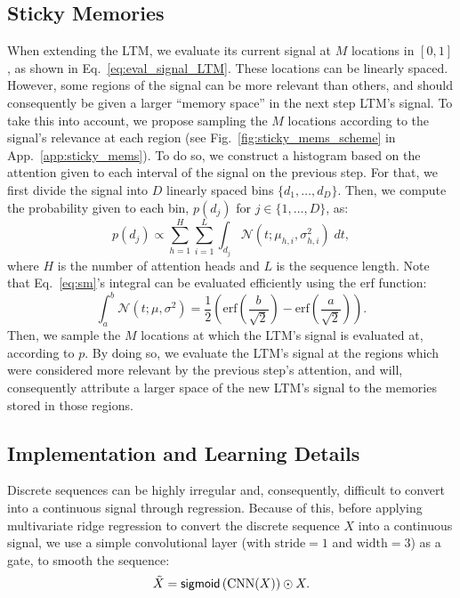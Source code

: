 \documentclass[11pt]{article}
\begin{document}
\subsection{Sticky Memories}
\label{sec:sticky_mem}
When extending the LTM, we evaluate its current signal at $M$ locations in $[0,1]$, as shown in Eq.~\ref{eq:eval_signal_LTM}. These locations can be linearly spaced. However, some regions of the signal can be more relevant than others, and should consequently be given a larger ``memory space'' in the next step LTM's signal. 
To take this into account, we propose sampling the $M$ locations according to the signal's relevance at each region (see Fig.~\ref{fig:sticky_mems_scheme} in App.~\ref{app:sticky_mems}). 
To do so, we construct a histogram based on the attention given to each interval of the signal on the previous step. For that, we first divide the signal into $D$ linearly spaced bins ${\{d_1,\dots,d_D\}}$. Then, we compute the probability given to each bin, $p(d_j)$ for ${j \in \{1,\dots,D\}}$, as:
\begin{equation}
    \label{eq:sm}
    p(d_j) \propto \sum_{h=1}^H \sum_{i=1}^L \int_{d_j} \mathcal{N} (t; \mu_{h,i}, \sigma_{h,i}^2 )\; dt,
\end{equation}
where $H$ is the number of attention heads and $L$ is the sequence length. Note that Eq.~\ref{eq:sm}'s integral can be evaluated efficiently using the erf function:
\begin{equation}
    \int_a^b \mathcal{N}(t; \mu, \sigma^2) = \frac{1}{2} \! \left( \mathrm{erf} \!\left(\dfrac{b}{\sqrt{2}}\right)-\mathrm{erf} \!\left(\dfrac{a}{\sqrt{2}}\right)\right).
\end{equation}
Then, we sample the $M$ locations at which the LTM's signal is evaluated at, according to $p$. 
By doing so, we evaluate the LTM's signal at the regions which were considered more relevant by the previous step's attention, and will, consequently attribute a larger space of the new LTM's signal to the memories stored in those regions.

\subsection{Implementation and Learning Details}

Discrete sequences can be highly irregular and, consequently, difficult to convert into a continuous signal through regression. 
Because of this, before applying multivariate ridge regression to convert the discrete sequence $X$ into a continuous signal,  we use a simple convolutional layer (with $\text{stride}=1$ and $\text{width}=3$)  as a gate, to smooth the sequence:
\begin{equation}
    \Tilde{X} = \mathsf{sigmoid} \left(\mathrm{CNN}(X)\right) \odot X.
\end{equation}
\end{document}
